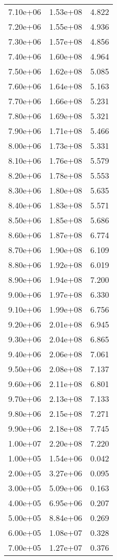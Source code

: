 \begin{table}
\begin{tabular}{lll}
7.10e+06 & 1.53e+08 & 4.822 \\
7.20e+06 & 1.55e+08 & 4.936 \\
7.30e+06 & 1.57e+08 & 4.856 \\
7.40e+06 & 1.60e+08 & 4.964 \\
7.50e+06 & 1.62e+08 & 5.085 \\
7.60e+06 & 1.64e+08 & 5.163 \\
7.70e+06 & 1.66e+08 & 5.231 \\
7.80e+06 & 1.69e+08 & 5.321 \\
7.90e+06 & 1.71e+08 & 5.466 \\
8.00e+06 & 1.73e+08 & 5.331 \\
8.10e+06 & 1.76e+08 & 5.579 \\
8.20e+06 & 1.78e+08 & 5.553 \\
8.30e+06 & 1.80e+08 & 5.635 \\
8.40e+06 & 1.83e+08 & 5.571 \\
8.50e+06 & 1.85e+08 & 5.686 \\
8.60e+06 & 1.87e+08 & 6.774 \\
8.70e+06 & 1.90e+08 & 6.109 \\
8.80e+06 & 1.92e+08 & 6.019 \\
8.90e+06 & 1.94e+08 & 7.200 \\
9.00e+06 & 1.97e+08 & 6.330 \\
9.10e+06 & 1.99e+08 & 6.756 \\
9.20e+06 & 2.01e+08 & 6.945 \\
9.30e+06 & 2.04e+08 & 6.865 \\
9.40e+06 & 2.06e+08 & 7.061 \\
9.50e+06 & 2.08e+08 & 7.137 \\
9.60e+06 & 2.11e+08 & 6.801 \\
9.70e+06 & 2.13e+08 & 7.133 \\
9.80e+06 & 2.15e+08 & 7.271 \\
9.90e+06 & 2.18e+08 & 7.745 \\
1.00e+07 & 2.20e+08 & 7.220 \\
1.00e+05 & 1.54e+06 & 0.042 \\
2.00e+05 & 3.27e+06 & 0.095 \\
3.00e+05 & 5.09e+06 & 0.163 \\
4.00e+05 & 6.95e+06 & 0.207 \\
5.00e+05 & 8.84e+06 & 0.269 \\
6.00e+05 & 1.08e+07 & 0.328 \\
7.00e+05 & 1.27e+07 & 0.376 \\

\end{tabular}
\end{table}
